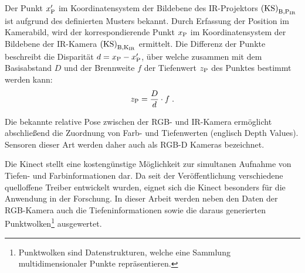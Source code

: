 Der Punkt $x_{{\mathrm{P}}}'$ im Koordinatensystem der Bildebene des IR-Projektors ${\mathrm{(KS)}}_{\mathrm{B,P_{IR}}}$ ist aufgrund des definierten Musters bekannt. Durch Erfassung der Position im Kamerabild, wird der korrespondierende Punkt $x_{{\mathrm{P}}}$ im Koordinatensystem der Bildebene der IR-Kamera ${\mathrm{(KS)}}_{\mathrm{B,K_{IR}}}$ ermittelt. Die Differenz der Punkte beschreibt die Disparität $d = x_{\mathrm{P}} - x_{{\mathrm{P}}}'$, über welche zusammen mit dem Basisabstand $D$ und der Brennweite $f$ der Tiefenwert $z_{\mathrm{P}}$ des Punktes bestimmt werden kann:
%
%
%
\begin{equation}
z_{\mathrm{P}} = \frac{D}{d}\cdot f \; \text{.}
\end{equation}
\vspace{5mm}

Die bekannte relative Pose zwischen der RGB- und IR-Kamera ermöglicht abschließend die Zuordnung von Farb- und Tiefenwerten (englisch Depth Values). Sensoren dieser Art werden daher auch als RGB-D Kameras bezeichnet.\\


Die Kinect stellt eine kostengünstige Möglichkeit zur simultanen Aufnahme von Tiefen- und Farbinformationen dar. Da seit der Veröffentlichung verschiedene quelloffene Treiber entwickelt wurden, eignet sich die Kinect besonders für die Anwendung in der Forschung. In dieser Arbeit werden neben den Daten der RGB-Kamera auch die Tiefeninformationen sowie die daraus generierten Punktwolken\footnote{Punktwolken sind Datenstrukturen, welche eine Sammlung multidimensionaler Punkte repräsentieren.} ausgewertet.



